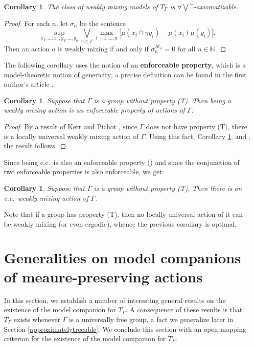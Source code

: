 \documentclass[12pt]{amsart}
\newtheorem{cor}[thm]{Corollary}
\theoremstyle{definition}
\def\bb{\mathbb}
\def\bb{\mathbb}
\def\cal{\mathcal}
\begin{document}
\begin{cor}\label{weakAVE}
The class of weakly mixing models of $T_\Gamma$ is $\forall\bigvee\exists$-axiomatizable.
\end{cor}

\begin{proof}
For each $n$, let $\sigma_n$ be the sentence
$$\sup_{x_1,\ldots,x_n,y_1,\ldots,y_n}\bigvee_{\gamma \in \Gamma}\max_{i=1,\ldots,n}|\mu(x_i\cap \gamma y_i)-\mu(x_i)\mu(y_i)|.$$
Then an action $a$ is weakly mixing if and only if $\sigma_n^{\cal M_a}=0$ for all $n\in \bb N$.
\end{proof}

The following corollary uses the notion of an \textbf{enforceable property}, which is a model-theoretic notion of genericity; a precise definition can be found in the first author's article \cite{enforceable}.

\begin{cor}
Suppose that $\Gamma$ is a group without property (T).  Then being a weakly mixing action is an enforceable property of actions of $\Gamma$.
\end{cor}

\begin{proof}
By a result of Kerr and Pichot \cite{KP}, since $\Gamma$ does not have property (T), there is a locally universal weakly mixing action of $\Gamma$.  Using this fact, Corollary \ref{weakAVE}, and \cite[Proposition 2.6]{enforceable}, the result follows.
\end{proof}

Since being e.c.\ is also an enforceable property (\cite[Proposition 2.10]{enforceable}) and since the conjunction of two enforceable properties is also enforceable, we get:

\begin{cor}
Suppose that $\Gamma$ is a group without property (T).  Then there is an e.c.\ weakly mixing action of $\Gamma$.
\end{cor}

Note that if a group has property (T), then no locally universal action of it can be weakly mixing (or even ergodic), whence the previous corollary is optimal.

\section{Generalities on model companions of meaure-preserving actions}

In this section, we establish a number of interesting general results on the existence of the model companion for $T_\Gamma$.  A consequence of these results is that $T_\Gamma$ exists whenever $\Gamma$ is a universally free group, a fact we generalize later in Section \ref{approximatelytreeable}.  We conclude this section with an open mapping criterion for the existence of the model companion for $T_\Gamma$.
\end{document}
